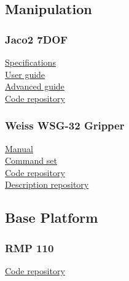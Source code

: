 \subsection{Manipulation}
\subsubsection{Jaco2 7DOF}
\href{http://www.kinovarobotics.com/wp-content/uploads/2017/04/JACO-7-Spherical-DOF-Technical-Specifications.pdf}{Specifications} \\
\href{http://www.kinovarobotics.com/wp-content/uploads/2017/06/JACO%C2%B2-User-Guide-Asstive-Robotics-April-2017.pdf}{User guide} \\
\href{http://www.kinovarobotics.com/wp-content/uploads/2017/04/JACO-7-Spherical-DOF-Advanced-Guide.pdf}{Advanced guide} \\
\href{https://github.com/GT-RAIL/kinova-ros/tree/7dof_kinetic}{Code repository} \\

\subsubsection{Weiss WSG-32 Gripper}
\href{https://www.weiss-robotics.com/wp-content/uploads/wsg32_manual.pdf}{Manual} \\
\href{https://www.weiss-robotics.com/wp-content/uploads/wsg_command_set_reference_manual-4-0-0.pdf}{Command set} \\
\href{https://github.com/si-machines/wsg50-ros-pkg/tree/kinetic_devel}{Code repository} \\
\href{http://wiki.ros.org/wsg_32_description}{Description repository} \\

\subsection{Base Platform}
\subsubsection{RMP 110}
\href{https://github.com/StanleyInnovation/segway_v3}{Code repository}
